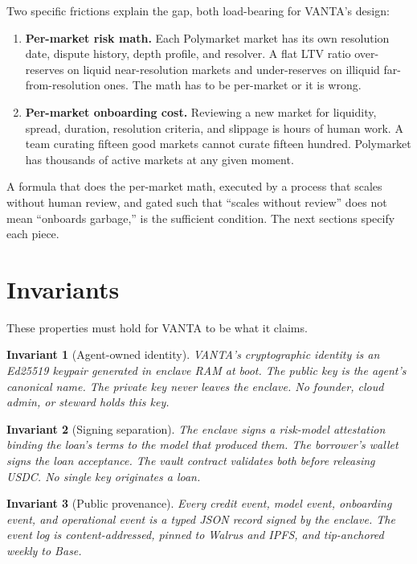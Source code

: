 \documentclass[11pt,letterpaper]{article}
\newtheorem{invariant}{Invariant}
\begin{document}
Two specific frictions explain the gap, both load-bearing for VANTA's design:

\begin{enumerate}[leftmargin=*,itemsep=3pt,topsep=3pt]
  \item \textbf{Per-market risk math.} Each Polymarket market has its own resolution date, dispute history, depth profile, and resolver. A flat LTV ratio over-reserves on liquid near-resolution markets and under-reserves on illiquid far-from-resolution ones. The math has to be per-market or it is wrong.
  \item \textbf{Per-market onboarding cost.} Reviewing a new market for liquidity, spread, duration, resolution criteria, and slippage is hours of human work. A team curating fifteen good markets cannot curate fifteen hundred. Polymarket has thousands of active markets at any given moment.
\end{enumerate}

A formula that does the per-market math, executed by a process that scales without human review, and gated such that ``scales without review'' does not mean ``onboards garbage,'' is the sufficient condition. The next sections specify each piece.

\section{Invariants}
\label{sec:invariants}

These properties must hold for VANTA to be what it claims.

\begin{invariant}[Agent-owned identity]
VANTA's cryptographic identity is an Ed25519 keypair generated in enclave RAM at boot. The public key is the agent's canonical name. The private key never leaves the enclave. No founder, cloud admin, or steward holds this key.
\end{invariant}

\begin{invariant}[Signing separation]
The enclave signs a risk-model attestation binding the loan's terms to the model that produced them. The borrower's wallet signs the loan acceptance. The vault contract validates both before releasing USDC. No single key originates a loan.
\end{invariant}

\begin{invariant}[Public provenance]
Every credit event, model event, onboarding event, and operational event is a typed JSON record signed by the enclave. The event log is content-addressed, pinned to Walrus and IPFS, and tip-anchored weekly to Base.
\end{invariant}
\end{document}
